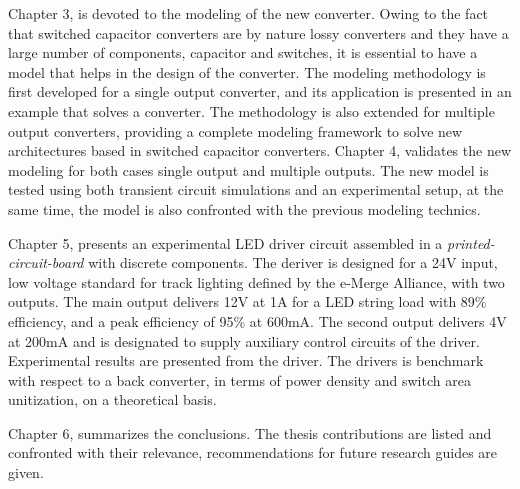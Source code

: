Chapter 3, is devoted to the modeling of the new converter. Owing to the fact that switched capacitor converters are by nature lossy converters and they have a large number of components, capacitor and switches, it is essential to have a model that helps in the design of the converter.  The modeling methodology is first developed for a single output converter, and its application is presented in an example that solves a converter. The methodology is also extended for multiple output converters, providing a complete modeling framework to solve new architectures based in switched capacitor converters. Chapter 4, validates the new modeling for both cases single output and multiple outputs. The new model is tested using both transient circuit simulations and an experimental setup, at the same time, the model is also confronted with the previous modeling technics.

Chapter 5, presents an experimental LED driver circuit assembled in a \emph{printed-circuit-board} with discrete components. The deriver is designed for a 24V input, low voltage standard for track lighting defined by the e-Merge Alliance, with two outputs. The main output delivers 12V at 1A for a LED string load with 89\% efficiency, and a peak efficiency of 95\% at 600mA. The second output delivers 4V at 200mA and is designated to supply auxiliary control circuits of the driver. Experimental results are presented from the driver.  The drivers is benchmark with respect to a back converter, in terms of power density and switch area unitization, on a theoretical basis.

Chapter 6, summarizes the conclusions.  The thesis contributions are listed and confronted with their relevance, recommendations for future research guides are given. 


 